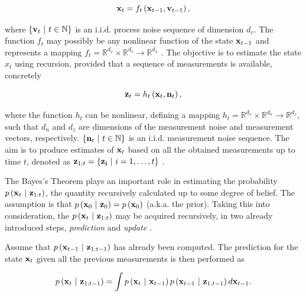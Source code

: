 \begin{equation}
    \label{eq:ProbModelStateEvolution}
    \mathbf{x}_t = {f_t} \left( \mathbf{x}_{t - 1}, \mathbf{v}_{t - 1} \right),
\end{equation}

\noindent where $\left\{ {\mathbf{v}_t \ | \ t \in \mathbb{N}} \right\}$ is an i.i.d. process noise sequence of dimension $d_v$. The function $f_t$ may possibly be any nonlinear function of the state $\mathbf{x}_{t - 1}$ and represents a mapping $f_t = \mathbb{R}^{d_x} \times \mathbb{R}^{d_v} \to \mathbb{R}^{d_x}$ \cite{Arulampalam2007}. The objective is to estimate the state $x_t$ using recursion, provided that a sequence of measurements is available, concretely

\begin{equation}
    \mathbf{z}_t = {h_t} \left( \mathbf{x}_t, \mathbf{n}_t \right),
\end{equation}

\noindent where the function $h_t$ can be nonlinear, defining a mapping $h_t = \mathbb{R}^{d_x} \times \mathbb{R}^{d_n} \to \mathbb{R}^{d_z}$, such that $d_n$ and $d_z$ are dimensions of the measurement noise and measurement vectors, respectively. $\left\{ {\mathbf{n}_t \ | \ t \in \mathbb{N}} \right\}$ is an i.i.d. measurement noise sequence. The aim is to produce estimates of $\mathbf{x}_t$ based on all the obtained measurements up to time $t$, denoted as $\mathbf{z}_{1:t} = \left\{ {\mathbf{z_i} \ | \ i = 1, \dots, t} \right\}$ \cite{Arulampalam2007}.

The Bayes's Theorem plays an important role in estimating the probability $p \left( \mathbf{x}_t \ | \ \mathbf{z}_{1:t} \right)$, the quantity recursively calculated up to some degree of belief. The assumption is that $p \left( \mathbf{x}_0 \ | \ \mathbf{z}_0 \right) = p \left( \mathbf{x}_0 \right)$ (a.k.a. the prior). Taking this into consideration, the $p \left( \mathbf{x}_t \ | \ \mathbf{z}_{1:t} \right)$ may be acquired recursively, in two already introduced steps, \emph{prediction} and \emph{update} \cite{Arulampalam2007}.

Assume that $p \left( \mathbf{x}_{t - 1} \ | \ \mathbf{z}_{1:t - 1} \right)$ has already been computed. The prediction for the state $\mathbf{x}_t$ given all the previous measurements is then performed as

\begin{equation}
    \label{eq:BayesianOptimPrediction}
    p \left( \mathbf{x}_t \ | \ \mathbf{z}_{1:t - 1} \right) = \int p \left( \mathbf{x}_t \ | \ \mathbf{x}_{t - 1} \right) p \left( \mathbf{x}_{t - 1} \ | \ \mathbf{z}_{1:t - 1} \right) d\mathbf{x}_{t - 1}.
\end{equation}

